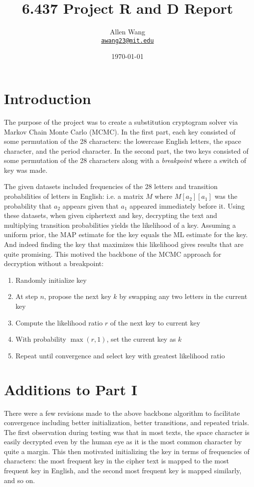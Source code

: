 \documentclass{article}
\title{\textbf{6.437 Project R and D Report}}%
\date{\today}
\author{Allen Wang\\ \href{mailto:awang23@mit.edu}{\texttt{awang23@mit.edu}}}
\theoremstyle{definition}
\theoremstyle{remark}
\begin{document}
\setcounter{tocdepth}{4}
\maketitle

\section{Introduction}

The purpose of the project was to create a substitution cryptogram solver via Markov Chain Monte Carlo (MCMC). In the first part, each key consisted of some permutation of the 28 characters: the lowercase English letters, the space character, and the period character. In the second part, the two keys consisted of some permutation of the 28 characters along with a \textit{breakpoint} where a switch of key was made.

The given datasets included frequencies of the 28 letters and transition probabilities of letters in English: i.e. a matrix $M$ where $M[a_2][a_1]$ was the probability that $a_2$ appears given that $a_1$ appeared immediately before it. Using these datasets, when given ciphertext and key, decrypting the text and multiplying transition probabilities yields the likelihood of a key. Assuming a uniform prior, the MAP estimate for the key equals the ML estimate for the key. And indeed finding the key that maximizes this likelihood gives results that are quite promising. This motived the backbone of the MCMC approach for decryption without a breakpoint:

\begin{enumerate}
	\item Randomly initialize key
	\item At step $n$, propose the next key $k$ by swapping any two letters in the current key
	\item Compute the likelihood ratio $r$ of the next key to current key
	\item With probability $\max(r, 1)$, set the current key as $k$
	\item Repeat until convergence and select key with greatest likelihood ratio
\end{enumerate}

\section{Additions to Part I}
There were a few revisions made to the above backbone algorithm to facilitate convergence including better initialization, better transitions, and repeated trials. The first observation during testing was that in most texts, the space character is easily decrypted even by the human eye as it is the most common character by quite a margin. This then motivated initializing the key in terms of frequencies of characters: the most frequent key in the cipher text is mapped to the most frequent key in English, and the second most frequent key is mapped similarly, and so on.
\end{document}
